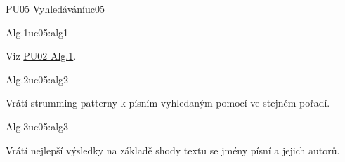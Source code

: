 \begin{usecase}{PU05 Vyhledávání}{uc05}
    \begin{scenario}{Alg.1}{uc05:alg1}
        \item Viz \hyperref[uc02:alg1]{PU02 Alg.1}.
    \end{scenario}

    \begin{scenario}{Alg.2}{uc05:alg2}
        \item Vrátí strumming patterny k písním vyhledaným pomocí  ve stejném pořadí.
    \end{scenario}

    \begin{scenario}{Alg.3}{uc05:alg3}
        \item Vrátí nejlepší výsledky na základě shody textu se jmény písní a jejich autorů.
    \end{scenario}
\end{usecase}
